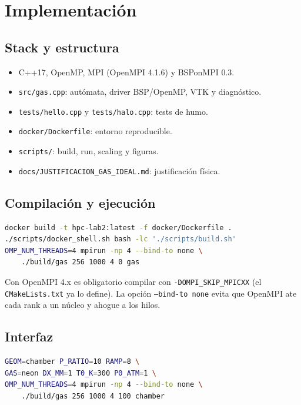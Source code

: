 \documentclass[11pt,a4paper]{article}
\begin{document}
\section{Implementación}

\subsection{Stack y estructura}

\begin{itemize}[leftmargin=*]
  \item C++17, OpenMP, MPI (OpenMPI 4.1.6) y BSPonMPI 0.3.
  \item \texttt{src/gas.cpp}: autómata, driver BSP/OpenMP, VTK y diagnóstico.
  \item \texttt{tests/hello.cpp} y \texttt{tests/halo.cpp}: tests de humo.
  \item \texttt{docker/Dockerfile}: entorno reproducible.
  \item \texttt{scripts/}: build, run, scaling y figuras.
  \item \texttt{docs/JUSTIFICACION\_GAS\_IDEAL.md}: justificación física.
\end{itemize}

\subsection{Compilación y ejecución}

\begin{lstlisting}[language=bash,style=cpp]
docker build -t hpc-lab2:latest -f docker/Dockerfile .
./scripts/docker_shell.sh bash -lc './scripts/build.sh'
OMP_NUM_THREADS=4 mpirun -np 4 --bind-to none \
    ./build/gas 256 1000 4 0 gas
\end{lstlisting}

Con OpenMPI 4.x es obligatorio compilar con \texttt{-DOMPI\_SKIP\_MPICXX}
(el \texttt{CMakeLists.txt} ya lo define). La opción \texttt{--bind-to none}
evita que OpenMPI ate cada rank a un núcleo y ahogue a los hilos.

\subsection{Interfaz}

\begin{lstlisting}[language=bash,style=cpp]
GEOM=chamber P_RATIO=10 RAMP=8 \
GAS=neon DX_MM=1 T0_K=300 P0_ATM=1 \
OMP_NUM_THREADS=4 mpirun -np 4 --bind-to none \
    ./build/gas 256 1000 4 100 chamber
\end{lstlisting}
\end{document}
